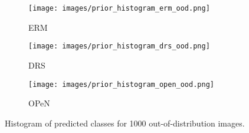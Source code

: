 \begin{figure}[!ht]
    \centering
    \begin{subfigure}[b]{0.32\textwidth}
        \centering
        \texttt{[image: images/prior\_histogram\_erm\_ood.png]}
        \caption{ERM}
        \label{fig:ood_image_classification_erm}
    \end{subfigure}
    \hfill
    \begin{subfigure}[b]{0.32\textwidth}
        \centering
        \texttt{[image: images/prior\_histogram\_drs\_ood.png]}
        \caption{DRS}
        \label{fig:ood_image_classification_drs}
    \end{subfigure}
    \hfill
    \begin{subfigure}[b]{0.32\textwidth}
        \centering
        \texttt{[image: images/prior\_histogram\_open\_ood.png]}
        \caption{OPeN}
        \label{fig:ood_image_classification_open}
    \end{subfigure}
    \caption{Histogram of predicted classes for 1000 out-of-distribution images.}
    \label{fig:ood_image_classification}
\end{figure}

